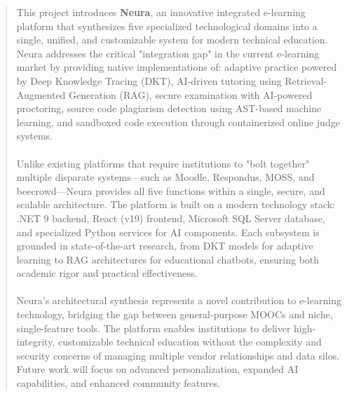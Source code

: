 \begin{abstract}
\noindent This project introduces \textbf{Neura}, an innovative integrated e-learning platform that synthesizes five specialized technological domains into a single, unified, and customizable system for modern technical education. Neura addresses the critical "integration gap" in the current e-learning market by providing native implementations of: adaptive practice powered by Deep Knowledge Tracing (DKT), AI-driven tutoring using Retrieval-Augmented Generation (RAG), secure examination with AI-powered proctoring, source code plagiarism detection using AST-based machine learning, and sandboxed code execution through containerized online judge systems.
\\
\\
\noindent Unlike existing platforms that require institutions to "bolt together" multiple disparate systems—such as Moodle, Respondus, MOSS, and beecrowd—Neura provides all five functions within a single, secure, and scalable architecture. The platform is built on a modern technology stack: .NET 9 backend, React (v19) frontend, Microsoft SQL Server database, and specialized Python services for AI components. Each subsystem is grounded in state-of-the-art research, from DKT models for adaptive learning to RAG architectures for educational chatbots, ensuring both academic rigor and practical effectiveness.
\\
\\
\noindent Neura's architectural synthesis represents a novel contribution to e-learning technology, bridging the gap between general-purpose MOOCs and niche, single-feature tools. The platform enables institutions to deliver high-integrity, customizable technical education without the complexity and security concerns of managing multiple vendor relationships and data silos. Future work will focus on advanced personalization, expanded AI capabilities, and enhanced community features.
\end{abstract}